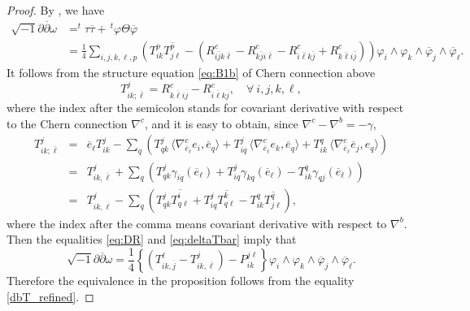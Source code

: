 \documentclass{amsart}
\numberwithin{equation}{section}
\theoremstyle{definition}
\renewcommand{\1}{\mathds{1}}
\renewcommand{\>}{\rightarrow}
\begin{document}
\begin{proof}
By \cite[Lemma 1]{ZhaoZ19Str}, we have
\[\begin{aligned}
\sqrt{-1} \partial \overline{\partial} \omega &=  ^t\!\!\tau  \overline{\tau} + \, ^t\!\varphi \Theta \overline{\varphi}\\
&= \frac{1}{4} \sum_{i,j,k,\ell,p}\left(T^p_{ik}\overline{T^p_{j\ell}}
- (R^c_{i\bar{j}k\bar{\ell}} - R^c_{k\bar{j}i\bar{\ell}}- R^c_{i\bar{\ell}k\bar{j}}+R^c_{k\bar{\ell}i\bar{j}})\right)
\varphi_i \wedge \varphi_k \wedge \overline{\varphi}_j \wedge \overline{\varphi}_{\ell}.
\end{aligned}\]
It follows from the structure equation \eqref{eq:B1b} of Chern connection above
\begin{equation}\label{eq:DR}
T^j_{ik;\overline{\ell}}  =  R^c_{k\overline{\ell}i\overline{j}} - R^c_{i\overline{\ell}k\overline{j}}, \quad \forall\ i,j,k,\ell,
\end{equation}
where the index after the semicolon stands for covariant derivative with respect to the Chern connection $\nabla^c$, and it is easy to obtain,
since $\nabla^{c}-\nabla^b = -\gamma$,
\begin{eqnarray}
T^j_{ik ; \overline{\ell}} & = & \overline{e}_{\ell} T^j_{ik} - \sum_q \left(T^j_{qk}\,\langle  \nabla^{c}_{\overline{e}_{\ell} } e_i, \overline{e}_q \rangle
+ T^j_{iq}\,\langle   \nabla^{c}_{\overline{e}_{\ell} } e_k, \overline{e}_q \rangle
+ T^q_{ik}\, \langle  \nabla^{c}_{\overline{e}_{\ell} }  \overline{e}_j, e_q\rangle  \right) \nonumber \\
& = & T^j_{ik , \overline{\ell}} + \sum_q \left( T^j_{qk} \gamma_{iq}(\overline{e}_{\ell}) + T^j_{iq} \gamma_{kq}(\overline{e}_{\ell}) - T^q_{ik} \gamma_{qj}(\overline{e}_{\ell}) \right) \nonumber \\
& = & T^j_{ik , \overline{\ell}} - \sum_q \left( T^j_{qk} \overline{T^i_{q\ell }}  + T^j_{iq} \overline{T^k_{q\ell }} - T^q_{ik} \overline{T^q_{j\ell }} \right)\label{eq:deltaTbar},
\end{eqnarray}
where the index after the comma means covariant derivative with respect to $\nabla^b$. Then the equalities \eqref{eq:DR} and \eqref{eq:deltaTbar} imply that \[\sqrt{-1}\partial \overline{\partial} \omega = \frac{1}{4} \left\{ (T^{\ell}_{ik,\overline{j}} - T^j_{ik,\overline{\ell}})-P^{j\ell}_{ik} \right\} \varphi_i \wedge \varphi_k \wedge \overline{\varphi}_j \wedge \overline{\varphi}_{\ell}.\]
Therefore the equivalence in the proposition follows from the equality \eqref{dbT_refined}.
\end{proof}
\end{document}
